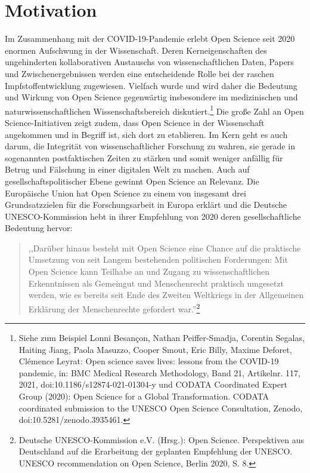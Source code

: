 \onehalfspacing

\section{Motivation}

Im Zusammenhang mit der COVID-19-Pandemie erlebt Open Science seit 2020 enormen Aufschwung in der Wissenschaft. Deren Kerneigenschaften des ungehinderten kollaborativen Austauschs von wissenschaftlichen Daten, Papers und Zwischenergebnissen werden eine entscheidende Rolle bei der raschen Impfstoffentwicklung zugewiesen. Vielfach wurde und wird daher die Bedeutung und Wirkung von Open Science gegenwärtig insbesondere im medizinischen und naturwissenschaftlichen Wissenschaftsbereich diskutiert.\footnote{Siehe zum Beispiel Lonni Besançon, Nathan Peiffer-Smadja, Corentin Segalas, Haiting Jiang, Paola Masuzzo, Cooper Smout, Eric Billy, Maxime Deforet, Clémence Leyrat: Open science saves lives: lessons from the COVID-19 pandemic, in: BMC Medical Research Methodology, Band 21, Artikelnr. 117, 2021, doi:10.1186/s12874-021-01304-y und CODATA Coordinated Expert Group (2020): Open Science for a Global Transformation. CODATA coordinated submission to the UNESCO Open Science Consultation, Zenodo, doi:10.5281/zenodo.3935461.} Die große Zahl an Open Science-Initiativen zeigt zudem, dass Open Science in der Wissenschaft angekommen und in Begriff ist, sich dort zu etablieren. Im Kern geht es auch darum, die Integrität von wissenschaftlicher Forschung zu wahren, sie gerade in sogenannten postfaktischen Zeiten zu stärken und somit weniger anfällig für Betrug und Fälschung in einer digitalen Welt zu machen. Auch auf gesellschaftspolitischer Ebene gewinnt Open Science an Relevanz. Die Europäische Union hat Open Science zu einem von insgesamt drei Grundsatzzielen für die Forschungsarbeit in Europa erklärt und die Deutsche UNESCO-Kommission hebt in ihrer Empfehlung von 2020 deren gesellschaftliche Bedeutung hervor:

\begin{quote}     
    ,,Darüber hinaus besteht mit Open Science eine Chance auf die praktische Umsetzung von seit Langem bestehenden politischen Forderungen: Mit Open Science kann Teilhabe an und Zugang zu wissenschaftlichen Erkenntnissen als Gemeingut und Menschenrecht praktisch umgesetzt werden, wie es bereits seit Ende des Zweiten Weltkriegs in der Allgemeinen Erklärung der Menschenrechte gefordert war.''\footnote{Deutsche UNESCO-Kommission e.V. (Hrsg.): Open Science. Perspektiven aus Deutschland auf die Erarbeitung der geplanten Empfehlung der UNESCO. UNESCO recommendation on Open Science, Berlin 2020, S. 8.}    
\end{quote}

